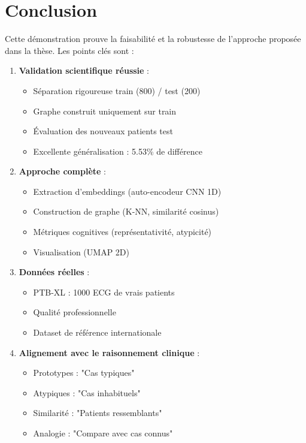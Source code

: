 \documentclass[12pt,a4paper]{article}
\begin{document}
\section{Conclusion}

Cette démonstration prouve la faisabilité et la robustesse de l'approche proposée dans la thèse. Les points clés sont :

\begin{enumerate}
    \item \textbf{Validation scientifique réussie} :
    \begin{itemize}
        \item Séparation rigoureuse train (800) / test (200)
        \item Graphe construit uniquement sur train
        \item Évaluation des nouveaux patients test
        \item Excellente généralisation : 5.53\% de différence
    \end{itemize}

    \item \textbf{Approche complète} :
    \begin{itemize}
        \item Extraction d'embeddings (auto-encodeur CNN 1D)
        \item Construction de graphe (K-NN, similarité cosinus)
        \item Métriques cognitives (représentativité, atypicité)
        \item Visualisation (UMAP 2D)
    \end{itemize}

    \item \textbf{Données réelles} :
    \begin{itemize}
        \item PTB-XL : 1000 ECG de vrais patients
        \item Qualité professionnelle
        \item Dataset de référence internationale
    \end{itemize}

    \item \textbf{Alignement avec le raisonnement clinique} :
    \begin{itemize}
        \item Prototypes : "Cas typiques"
        \item Atypiques : "Cas inhabituels"
        \item Similarité : "Patients ressemblants"
        \item Analogie : "Compare avec cas connus"
    \end{itemize}
\end{enumerate}
\end{document}
